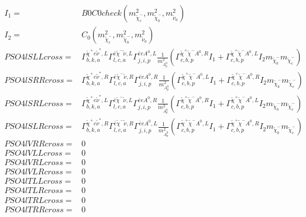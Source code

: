 \documentclass[A4,landscape]{article}
\begin{document}
\begin{align} 
I_1= & B0C0check(m^2_{\tilde{\chi}^-_{{c}}}, m^2_{\tilde{\chi}^-_{{b}}}, m^2_{\tilde{\nu}_{{a}}}) \\ 
I_2= & C_0(m^2_{\tilde{\chi}^-_{{c}}}, m^2_{\tilde{\chi}^-_{{b}}}, m^2_{\tilde{\nu}_{{a}}}) \\ 
  PSO4lSLLcross= &  \Gamma^{\tilde{\chi}^+e \tilde{\nu}^*,L}_{b, k, a} \Gamma^{\bar{e}\tilde{\chi}^- \tilde{\nu} ,L}_{l, c, a} \Gamma^{\bar{e}e A^0 ,L}_{j, i, p} \frac{1}{m^2_{A^0_{{p}}}} (\Gamma^{\tilde{\chi}^+\tilde{\chi}^- A^0 ,R}_{c, b, p} I_1 + \Gamma^{\tilde{\chi}^+\tilde{\chi}^- A^0 ,L}_{c, b, p} I_2 m_{\tilde{\chi}^-_{{b}}} m_{\tilde{\chi}^-_{{c}}}) \\ 
  PSO4lSRRcross= &  \Gamma^{\tilde{\chi}^+e \tilde{\nu}^*,R}_{b, k, a} \Gamma^{\bar{e}\tilde{\chi}^- \tilde{\nu} ,R}_{l, c, a} \Gamma^{\bar{e}e A^0 ,R}_{j, i, p} \frac{1}{m^2_{A^0_{{p}}}} (\Gamma^{\tilde{\chi}^+\tilde{\chi}^- A^0 ,L}_{c, b, p} I_1 + \Gamma^{\tilde{\chi}^+\tilde{\chi}^- A^0 ,R}_{c, b, p} I_2 m_{\tilde{\chi}^-_{{b}}} m_{\tilde{\chi}^-_{{c}}}) \\ 
  PSO4lSRLcross= &  \Gamma^{\tilde{\chi}^+e \tilde{\nu}^*,L}_{b, k, a} \Gamma^{\bar{e}\tilde{\chi}^- \tilde{\nu} ,L}_{l, c, a} \Gamma^{\bar{e}e A^0 ,R}_{j, i, p} \frac{1}{m^2_{A^0_{{p}}}} (\Gamma^{\tilde{\chi}^+\tilde{\chi}^- A^0 ,R}_{c, b, p} I_1 + \Gamma^{\tilde{\chi}^+\tilde{\chi}^- A^0 ,L}_{c, b, p} I_2 m_{\tilde{\chi}^-_{{b}}} m_{\tilde{\chi}^-_{{c}}}) \\ 
  PSO4lSLRcross= &  \Gamma^{\tilde{\chi}^+e \tilde{\nu}^*,R}_{b, k, a} \Gamma^{\bar{e}\tilde{\chi}^- \tilde{\nu} ,R}_{l, c, a} \Gamma^{\bar{e}e A^0 ,L}_{j, i, p} \frac{1}{m^2_{A^0_{{p}}}} (\Gamma^{\tilde{\chi}^+\tilde{\chi}^- A^0 ,L}_{c, b, p} I_1 + \Gamma^{\tilde{\chi}^+\tilde{\chi}^- A^0 ,R}_{c, b, p} I_2 m_{\tilde{\chi}^-_{{b}}} m_{\tilde{\chi}^-_{{c}}}) \\ 
  PSO4lVRRcross= & 0 \\ 
  PSO4lVLLcross= & 0 \\ 
  PSO4lVRLcross= & 0 \\ 
  PSO4lVLRcross= & 0 \\ 
  PSO4lTLLcross= & 0 \\ 
  PSO4lTLRcross= & 0 \\ 
  PSO4lTRLcross= & 0 \\ 
  PSO4lTRRcross= & 0 \\ 
\end{align} 
\end{document}
